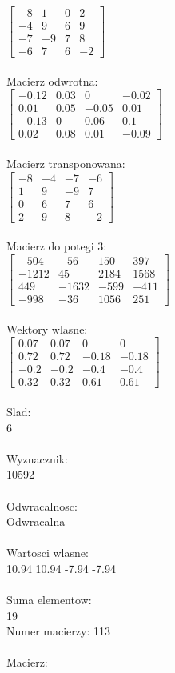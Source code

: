 \documentclass[a4paper,12pt]{article}
\begin{document}
$\begin{bmatrix} -8&1&0&2\\-4&9&6&9\\-7&-9&7&8\\-6&7&6&-2 \end{bmatrix}$
\\
\\
Macierz odwrotna:\\

$\begin{bmatrix} -0.12&0.03&0&-0.02\\0.01&0.05&-0.05&0.01\\-0.13&0&0.06&0.1\\0.02&0.08&0.01&-0.09 \end{bmatrix}$
\\
\\
Macierz transponowana:\\

$\begin{bmatrix} -8&-4&-7&-6\\1&9&-9&7\\0&6&7&6\\2&9&8&-2 \end{bmatrix}$
\\
\\
Macierz do potegi 3:\\

$\begin{bmatrix} -504&-56&150&397\\-1212&45&2184&1568\\449&-1632&-599&-411\\-998&-36&1056&251 \end{bmatrix}$
\\
\\
Wektory wlasne:\\

$\begin{bmatrix} 0.07&0.07&0&0\\0.72&0.72&-0.18&-0.18\\-0.2&-0.2&-0.4&-0.4\\0.32&0.32&0.61&0.61 \end{bmatrix}$
\\
\\
Slad:\\
6
\\
\\
Wyznacznik:\\
10592
\\
\\
Odwracalnosc:\\
Odwracalna
\\
\\
Wartosci wlasne:\\
10.94 10.94 -7.94 -7.94
\\
\\
Suma elementow:\\
19
\\
\newpage
Numer macierzy:
113
\\
\\
Macierz:\\
\end{document}
